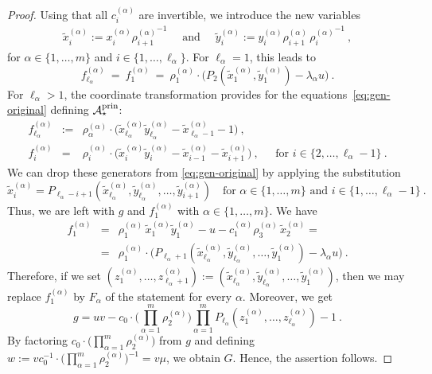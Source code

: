 \documentclass[letter,11pt]{amsart}
\newcommand{\prin}{{\rm prin}}
\newcommand{\cA}{\mathcal{A}}
\newcommand{\tx}{\widetilde x}
\newcommand{\ty}{\widetilde y}
\theoremstyle{theorem}
\theoremstyle{definition}
\newcommand{\len}{\ell}
\numberwithin{equation}{section}
\begin{document}
\begin{proof}
	Using that all $ c_i^{(\alpha)} $ are invertible, 
	we introduce the new variables
	\[
	\begin{array}{lcl} 
		\tx_i^{(\alpha)}
		:= 
		x_i^{(\alpha)} {\rho_{i+1}^{(\alpha)}}^{-1}
		& \
		\mbox{ and } 
		\ & 
		\ty_i^{(\alpha)}
		:= 
		y_i^{(\alpha)} \rho_{i+1}^{(\alpha)} \, {\rho_{i}^{(\alpha)}}^{-1}
		\ ,
	\end{array}
	\]
	for $ \alpha \in \{ 1, \ldots, m \} $ and $ i \in \{ 1, \ldots, \len_\alpha  \} $. 
	For $ \ell_\alpha = 1$, this leads to
	\[
		f_{\ell_\alpha}^{(\alpha)}
		\ = \
		f_1^{(\alpha)} 
		\ = \ 
		\rho_{1}^{(\alpha)} \cdot 
		\Big( 
		P_{2} (\tx_{1}^{(\alpha)}, \ty_{1}^{(\alpha)}) 
		- 
		\lambda_\alpha u  
		\Big) \ . 		
	\]
	For $ \ell_\alpha > 1 $, the coordinate transformation
	provides
	for the equations~\eqref{eq:gen-original} defining $ \cA_\star^\prin $:
	\[
	\begin{array}{rcll}
		f_{\len_\alpha}^{(\alpha)} 
		& := &
		\rho_\alpha^{(\alpha)} \cdot 
		\Big( 
		\tx_{\len_\alpha}^{(\alpha)} \ty_{\len_\alpha}^{(\alpha)} - \tx_{\len_\alpha-1}^{(\alpha)} - 1 
		\Big)   
		\ , 
		\\[10pt]
		f_{i}^{(\alpha)} 
		& = &
		\rho_{i}^{(\alpha)} \cdot 
		\Big(
		\tx_i^{(\alpha)} \ty_i^{(\alpha)} - \tx_{i-1}^{(\alpha)} - \tx_{i+1}^{(\alpha)} 
		\Big) 
		 \ ,
		&
		\ \ \ 
		\mbox{for } i \in \{ 2, \ldots, \len_\alpha - 1 \} \ .
	\end{array}
	\]
	We can drop these generators from \eqref{eq:gen-original}
	by applying the substitution
	\[
		\tx_i^{(\alpha)} 
		= 
		P_{\len_\alpha - i + 1 } (\tx_{\len_\alpha}^{(\alpha)}, \ty_{\len_\alpha}^{(\alpha)}, \ldots, \ty_{i + 1}^{(\alpha)}) 
		\ \ \
		\mbox{ for } 
		\alpha \in \{ 1, \ldots, m \}
		\mbox{ and }
		i \in \{ 1, \ldots, \len_\alpha-1\} 
		\ .
	\]
	Thus, we are left with $ g $ and 
	$ f_1^{(\alpha)} $ with $ \alpha \in \{ 1, \ldots, m \} $. 
	We have 
	\[
	\begin{array}{rcl}
		f_1^{(\alpha)} 
		& = & 
		\rho_{1}^{(\alpha)}
		\, \tx_{1}^{(\alpha)} \ty_{1}^{(\alpha)} - u - c_1^{(\alpha)} \rho_3^{(\alpha)}   \, \tx_{2}^{(\alpha)}  
		=
		\\[10pt]
		& = &
		\rho_{1}^{(\alpha)} \cdot 
		\Big( 
		P_{\len_\alpha+1} (\tx_{\len_\alpha}^{(\alpha)}, \ty_{\len_\alpha}^{(\alpha)}, \ldots, \ty_{1}^{(\alpha)}) 
		- 
		\lambda_\alpha u  
		\Big) \ . 
	\end{array} 
	\]
	Therefore, if we set
	$ ( z_1^{(\alpha)}, \ldots, z_{\len_\alpha + 1}^{(\alpha)} ) := (\tx_{\len_\alpha}^{(\alpha)}, \ty_{\len_\alpha}^{(\alpha)}, \ldots, \ty_{1}^{(\alpha)}) $,
	then we may replace
	$ f_1^{(\alpha)} $ by $ F_\alpha $ of the statement for every $ \alpha $.  
	Moreover, we get
	\[
		g = u v - c_0 \cdot \Big( \prod_{\alpha=1}^m 
		\rho_{2}^{(\alpha)} \Big) 
		\prod_{\alpha=1}^m P_{\len_\alpha} ( z_1^{(\alpha)}, \ldots, z_{\len_\alpha}^{(\alpha)}) - 1 
		\ . 
	\]
	By factoring $ \displaystyle c_0 \cdot \Big( \prod_{\alpha=1}^m 
	\rho_{2}^{(\alpha)} \Big)  $ from $ g $ 
	and defining $ \displaystyle w := v c_0^{-1} \cdot \Big( \prod_{\alpha=1}^m 
	\rho_{2}^{(\alpha)} \Big)^{-1}  = v \mu  $,
	we obtain $ G $.
	Hence, the assertion follows.  
\end{proof}
\end{document}

